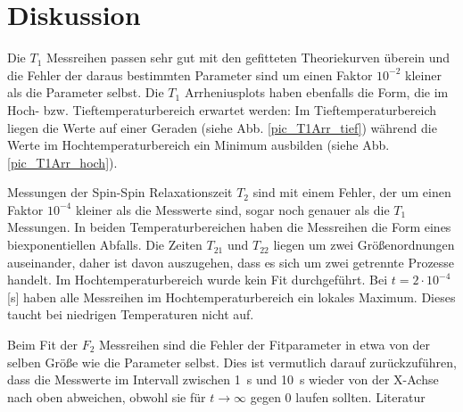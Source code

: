 \section{Diskussion}
Die $T_1$ Messreihen passen sehr gut mit den gefitteten Theoriekurven überein und die Fehler der daraus bestimmten Parameter sind um einen Faktor $10^{-2}$ kleiner als die Parameter selbst.
Die $T_1$ Arrheniusplots haben ebenfalls die Form, die im Hoch- bzw. Tieftemperaturbereich erwartet werden: Im Tieftemperaturbereich liegen die Werte auf einer Geraden (siehe Abb. \ref{pic_T1Arr_tief}) während die Werte im Hochtemperaturbereich ein Minimum ausbilden (siehe Abb. \ref{pic_T1Arr_hoch}).

Messungen der Spin-Spin Relaxationszeit $T_2$ sind mit einem Fehler, der um einen Faktor $10^{-4}$ kleiner als die Messwerte sind, sogar noch genauer als die $T_1$ Messungen. In beiden Temperaturbereichen haben die Messreihen die Form eines biexponentiellen Abfalls. Die Zeiten $T_{21}$ und $T_{22}$ liegen um zwei Größenordnungen auseinander, daher ist davon auszugehen, dass es sich um zwei getrennte Prozesse handelt.
Im Hochtemperaturbereich wurde kein Fit durchgeführt. Bei $t = 2\cdot 10^{-4}$ [s] haben alle Messreihen im Hochtemperaturbereich ein lokales Maximum. Dieses taucht bei niedrigen Temperaturen nicht auf.

Beim Fit der $F_2$ Messreihen sind die Fehler der Fitparameter in etwa von der selben Größe wie die Parameter selbst. Dies ist vermutlich darauf zurückzuführen, dass die Messwerte im Intervall zwischen \SI{1}{s} und \SI{10}{s} wieder von der X-Achse nach oben abweichen, obwohl sie für $t\rightarrow\infty$ gegen 0 laufen sollten.
\newpage
\Large{Literatur}\\\\





